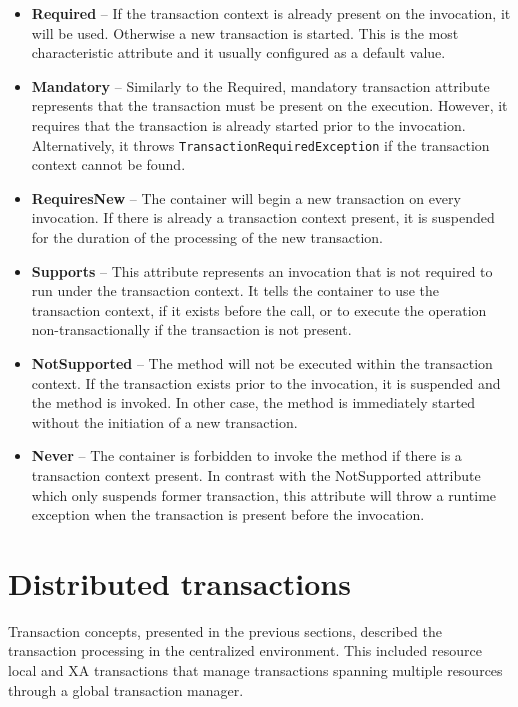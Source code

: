 \documentclass[oneside,
  digital, %
  table,   %
  lof,     %
  lot,     %
]{fithesis3}
\begin{document}
\begin{itemize}
    \item \textbf{Required} -- If the transaction context is already present on the invocation, it will be used. Otherwise a new transaction is started. This is the most characteristic attribute and it usually configured as a default value.
    
    \item \textbf{Mandatory} -- Similarly to the Required, mandatory transaction attribute represents that the transaction must be present on the execution. However, it requires that the transaction is already started prior to the invocation. Alternatively, it throws \texttt{TransactionRequiredException} if the transaction context cannot be found.
    
    \item \textbf{RequiresNew} -- The container will begin a new transaction on every invocation. If there is already a transaction context present, it is suspended for the duration of the processing of the new transaction. 
    
    \item \textbf{Supports} -- This attribute represents an invocation that is not required to run under the transaction context. It tells the container to use the transaction context, if it exists before the call, or to execute the operation non-transactionally if the transaction is not present.
    
    \item \textbf{NotSupported} -- The method will not be executed within the transaction context. If the transaction exists prior to the invocation, it is suspended and the method is invoked. In other case, the method is immediately started without the initiation of a new transaction.
    
    \item \textbf{Never} -- The container is forbidden to invoke the method if there is a transaction context present. In contrast with the NotSupported attribute which only suspends former transaction, this attribute will throw a runtime exception when the transaction is present before the invocation.
\end{itemize}

\section{Distributed transactions}

Transaction concepts, presented in the previous sections, described the transaction processing in the centralized environment. This included resource local and XA transactions that manage transactions spanning multiple resources through a global transaction manager.
\end{document}
